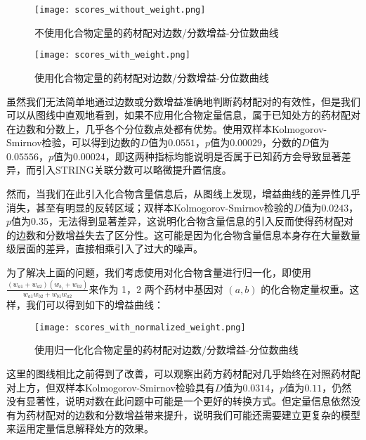 \begin{figure}[H]
  \centering
  \texttt{[image: scores\_without\_weight.png]}
  \caption{不使用化合物定量的药材配对边数/分数增益-分位数曲线}
  \label{fig:score_without_weight}
\end{figure}

\begin{figure}[H]
  \centering
  \texttt{[image: scores\_with\_weight.png]}
  \caption{使用化合物定量的药材配对边数/分数增益-分位数曲线}
  \label{fig:scores_with_weight}
\end{figure}


虽然我们无法简单地通过边数或分数增益准确地判断药材配对的有效性，但是我们可以从图线中直观地看到，如果不应用化合物定量信息，属于已知处方的药材配对在边数和分数上，几乎各个分位数点处都有优势。使用双样本Kolmogorov-Smirnov检验，可以得到边数的$D$值为$0.0551$，$p$值为$0.00029$，分数的$D$值为$0.05556$，$p$值为$0.00024$，即这两种指标均能说明是否属于已知药方会导致显著差异，而引入STRING关联分数可以略微提升置信度。

然而，当我们在此引入化合物含量信息后，从图线上发现，增益曲线的差异性几乎消失，甚至有明显的反转区域；双样本Kolmogorov-Smirnov检验的$D$值为$0.0243$，$p$值为$0.35$，无法得到显著差异，这说明化合物含量信息的引入反而使得药材配对的边数和分数增益失去了区分性。这可能是因为化合物含量信息本身存在大量数量级层面的差异，直接相乘引入了过大的噪声。

为了解决上面的问题，我们考虑使用对化合物含量进行归一化，即使用 $\frac{(w_{a1}+w_{a2})(w_{b_1}+w_{b2})}{w_{a1}w_{b2}+w_{b1}w_{a2}}$来作为 1，2 两个药材中基因对 $(a, b)$ 的化合物定量权重。这样，我们可以得到如下的增益曲线：

\begin{figure}[H]
  \centering
  \texttt{[image: scores\_with\_normalized\_weight.png]}
  \caption{使用归一化化合物定量的药材配对边数/分数增益-分位数曲线}
  \label{fig:scores_with_normalized_weight}
\end{figure}

这里的图线相比之前得到了改善，可以观察出药方药材配对几乎始终在对照药材配对上方，但双样本Kolmogorov-Smirnov检验具有$D$值为$0.0314$，$p$值为$0.11$，仍然没有显著性，说明对数在此问题中可能是一个更好的转换方式。但定量信息依然没有为药材配对的边数和分数增益带来提升，说明我们可能还需要建立更复杂的模型来运用定量信息解释处方的效果。


